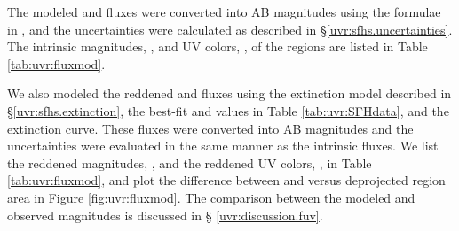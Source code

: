 The modeled \fuv{} and \nuv{} fluxes were converted into AB magnitudes using the
formulae in \citet{Morrissey:2007}, and the uncertainties were calculated as
described in \S \ref{uvr:sfhs.uncertainties}. The intrinsic \fuv{} magnitudes,
\fuvsfhz{}, and UV colors, \fuvnuvsfhz{}, of the
regions are listed in Table \ref{tab:uvr:fluxmod}.

We also modeled the reddened \fuv{} and \nuv{} fluxes using the extinction
model described in \S \ref{uvr:sfhs.extinction}, the best-fit \avf{} and \dav{}
values in Table \ref{tab:uvr:SFHdata}, and the \citet[][see \S
\ref{uvr:discussion.fuv}]{Cardelli:1989} extinction curve. These fluxes were
converted into AB magnitudes and the uncertainties were evaluated in the same
manner as the intrinsic fluxes. We list the reddened \fuv{} magnitudes,
\fuvsfh{}, and the reddened UV colors, \fuvnuvsfh{}, in Table
\ref{tab:uvr:fluxmod}, and plot the difference between \fuvsfh{} and \fuvobs{}
versus deprojected region area in Figure \ref{fig:uvr:fluxmod}. The comparison
between the modeled and observed \fuv{} magnitudes is discussed in \S
\ref{uvr:discussion.fuv}.





